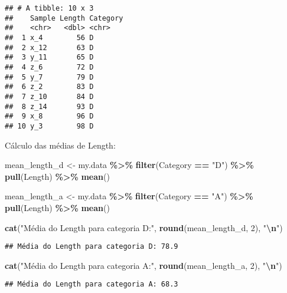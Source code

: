 \documentclass[
]{article}
\newenvironment{Shaded}{\begin{snugshade}}{\end{snugshade}}
\newcommand{\DecValTok}[1]{\textcolor[rgb]{0.00,0.00,0.81}{#1}}
\newcommand{\FunctionTok}[1]{\textcolor[rgb]{0.13,0.29,0.53}{\textbf{#1}}}
\newcommand{\NormalTok}[1]{#1}
\newcommand{\OtherTok}[1]{\textcolor[rgb]{0.56,0.35,0.01}{#1}}
\newcommand{\SpecialCharTok}[1]{\textcolor[rgb]{0.81,0.36,0.00}{\textbf{#1}}}
\newcommand{\StringTok}[1]{\textcolor[rgb]{0.31,0.60,0.02}{#1}}
\begin{document}
\begin{verbatim}
## # A tibble: 10 x 3
##    Sample Length Category
##    <chr>   <dbl> <chr>   
##  1 x_4        56 D       
##  2 x_12       63 D       
##  3 y_11       65 D       
##  4 z_6        72 D       
##  5 y_7        79 D       
##  6 z_2        83 D       
##  7 z_10       84 D       
##  8 z_14       93 D       
##  9 x_8        96 D       
## 10 y_3        98 D
\end{verbatim}

Cálculo das médias de Length:

\begin{Shaded}
\begin{Highlighting}[]
\NormalTok{mean\_length\_d }\OtherTok{\textless{}{-}}\NormalTok{ my.data }\SpecialCharTok{\%\textgreater{}\%} 
  \FunctionTok{filter}\NormalTok{(Category }\SpecialCharTok{==} \StringTok{"D"}\NormalTok{) }\SpecialCharTok{\%\textgreater{}\%} 
  \FunctionTok{pull}\NormalTok{(Length) }\SpecialCharTok{\%\textgreater{}\%} 
  \FunctionTok{mean}\NormalTok{()}

\NormalTok{mean\_length\_a }\OtherTok{\textless{}{-}}\NormalTok{ my.data }\SpecialCharTok{\%\textgreater{}\%} 
  \FunctionTok{filter}\NormalTok{(Category }\SpecialCharTok{==} \StringTok{"A"}\NormalTok{) }\SpecialCharTok{\%\textgreater{}\%} 
  \FunctionTok{pull}\NormalTok{(Length) }\SpecialCharTok{\%\textgreater{}\%} 
  \FunctionTok{mean}\NormalTok{()}

\FunctionTok{cat}\NormalTok{(}\StringTok{"Média do Length para categoria D:"}\NormalTok{, }\FunctionTok{round}\NormalTok{(mean\_length\_d, }\DecValTok{2}\NormalTok{), }\StringTok{"}\SpecialCharTok{\textbackslash{}n}\StringTok{"}\NormalTok{)}
\end{Highlighting}
\end{Shaded}

\begin{verbatim}
## Média do Length para categoria D: 78.9
\end{verbatim}

\begin{Shaded}
\begin{Highlighting}[]
\FunctionTok{cat}\NormalTok{(}\StringTok{"Média do Length para categoria A:"}\NormalTok{, }\FunctionTok{round}\NormalTok{(mean\_length\_a, }\DecValTok{2}\NormalTok{), }\StringTok{"}\SpecialCharTok{\textbackslash{}n}\StringTok{"}\NormalTok{)}
\end{Highlighting}
\end{Shaded}

\begin{verbatim}
## Média do Length para categoria A: 68.3
\end{verbatim}
\end{document}
